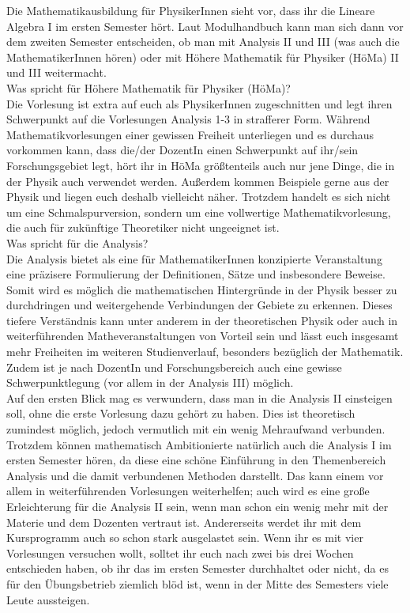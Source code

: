 \label{mathephysik}

Die Mathematikausbildung für PhysikerInnen sieht vor, dass ihr die Lineare Algebra I im ersten Semester hört. Laut Modulhandbuch kann man sich dann vor dem zweiten Semester entscheiden, ob man mit Analysis II und III (was auch die MathematikerInnen hören) oder mit Höhere Mathematik für Physiker (HöMa) II und III weitermacht.\\

Was spricht für Höhere Mathematik für Physiker (HöMa)?\\
Die Vorlesung ist extra auf euch als PhysikerInnen zugeschnitten und legt ihren Schwerpunkt auf die Vorlesungen Analysis 1-3 in strafferer Form. Während Mathematikvorlesungen einer gewissen
Freiheit unterliegen und es durchaus vorkommen kann, dass die/der DozentIn einen Schwerpunkt auf ihr/sein Forschungsgebiet legt, hört ihr in HöMa größtenteils auch nur jene Dinge, die in der Physik auch verwendet werden. Außerdem kommen Beispiele gerne aus der Physik und liegen euch deshalb vielleicht näher. Trotzdem handelt es sich nicht um eine Schmalspurversion, sondern um eine vollwertige Mathematikvorlesung, die auch für zukünftige Theoretiker nicht ungeeignet ist.\\

Was spricht für die Analysis?\\
Die Analysis bietet als eine für MathematikerInnen konzipierte Veranstaltung eine präzisere Formulierung der Definitionen, Sätze und insbesondere Beweise. Somit wird es möglich die mathematischen Hintergründe in der Physik besser zu durchdringen und weitergehende Verbindungen der Gebiete zu erkennen. Dieses tiefere Verständnis kann unter anderem in der theoretischen Physik oder auch in weiterführenden Matheveranstaltungen von Vorteil sein und lässt euch insgesamt mehr Freiheiten im weiteren Studienverlauf, besonders bezüglich der Mathematik.
Zudem ist je nach DozentIn und Forschungsbereich auch eine gewisse Schwerpunktlegung (vor allem in der Analysis III) möglich.\\

Auf den ersten Blick mag es verwundern, dass man in die Analysis II einsteigen soll, ohne die erste Vorlesung dazu gehört zu haben. Dies ist theoretisch zumindest möglich, jedoch vermutlich mit ein wenig Mehraufwand verbunden. Trotzdem können mathematisch Ambitionierte natürlich auch die Analysis I im ersten Semester hören, da diese eine schöne Einführung in den Themenbereich Analysis und die damit verbundenen Methoden darstellt. Das kann einem vor allem in weiterführenden Vorlesungen weiterhelfen; auch wird es eine große Erleichterung für die Analysis II sein, wenn man schon ein wenig mehr mit der Materie und dem Dozenten vertraut ist.
Andererseits werdet ihr mit dem Kursprogramm auch so schon stark ausgelastet sein. Wenn ihr es mit vier Vorlesungen versuchen wollt, solltet ihr euch nach zwei bis drei Wochen entschieden haben, ob ihr das im ersten Semester durchhaltet oder nicht, da es für den Übungsbetrieb ziemlich blöd ist, wenn in der Mitte des Semesters viele Leute aussteigen.
